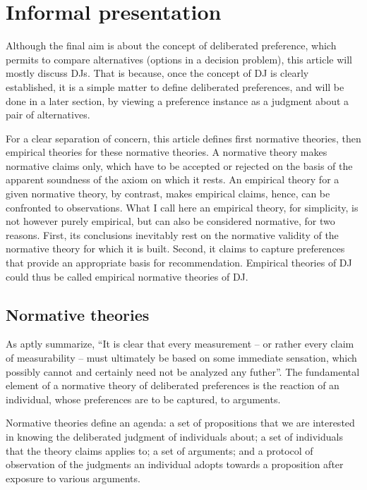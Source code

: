 \documentclass[version=last, pagesize, twoside=off, bibliography=totoc, DIV=calc, fontsize=12pt, a4paper, french, english]{scrartcl}
\begin{document}
\section{Informal presentation}
Although the final aim is about the concept of deliberated preference, which permits to compare alternatives (options in a decision problem), this article will mostly discuss \acp{DJ}. That is because, once the concept of \ac{DJ} is clearly established, it is a simple matter to define deliberated preferences, and will be done in a later section, by viewing a preference instance as a judgment about a pair of alternatives.

For a clear separation of concern, this article defines first normative theories, then empirical theories for these normative theories. A normative theory makes normative claims only, which have to be accepted or rejected on the basis of the apparent soundness of the axiom on which it rests. An empirical theory for a given normative theory, by contrast, makes empirical claims, hence, can be confronted to observations. What I call here an empirical theory, for simplicity, is not however purely empirical, but can also be considered normative, for two reasons. First, its conclusions inevitably rest on the normative validity of the normative theory for which it is built. Second, it claims to capture preferences that provide an appropriate basis for recommendation. Empirical theories of \ac{DJ} could thus be called empirical normative theories of \ac{DJ}.

\subsection{Normative theories}
As \citet[p.\ 16]{von_neumann_theory_2004} aptly summarize, “It is clear that every measurement – or rather every claim of measurability – must ultimately be based on some immediate sensation, which possibly cannot and certainly need not be analyzed any futher”. The fundamental element of a normative theory of deliberated preferences is the reaction of an individual, whose preferences are to be captured, to arguments. 

Normative theories define an agenda: a set of propositions that we are interested in knowing the deliberated judgment of individuals about; a set of individuals that the theory claims applies to; a set of arguments; and a protocol of observation of the judgments an individual adopts towards a proposition after exposure to various arguments.
\end{document}
